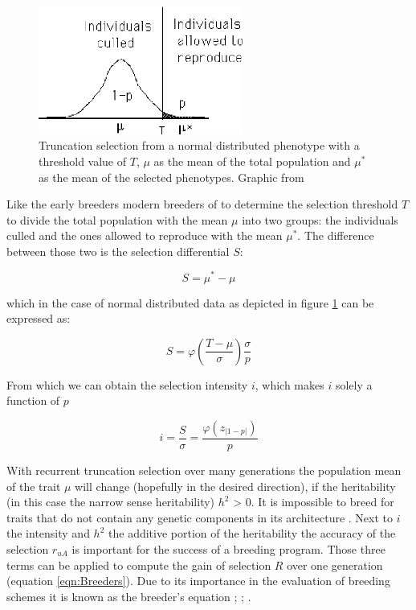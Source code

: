 \begin{figure}[H]
  \centering \includegraphics[height=.25\textheight, width=0.6\textwidth]{Figures/truncSel} \decoRule
  \caption[Truncation selection of a normal distributed phenotype]{Truncation selection from a normal distributed phenotype with a threshold value of $T$, $\mu$ as the mean of the total population and $\mu^{\ast}$ as the mean of the selected phenotypes. Graphic from \cite{walsh2018short}}
 \label{fig:trunSel}
\end{figure}


Like the early breeders modern breeders of to determine the selection threshold $T$ to divide the total population with the mean $\mu$ into two groups: the individuals culled and the ones allowed to reproduce with the mean $\mu^{\ast}$. The difference between those two is the selection differential $S$:

\begin{equation}
 S = \mu^{\ast} - \mu
\label{eqn:S}
\end{equation}

which in the case of normal distributed data as depicted in figure \ref{fig:trunSel} can be expressed as:

\begin{equation}
S = \varphi (\frac{T - \mu}{\sigma}) \frac{\sigma}{p}
\end{equation}

From which we can obtain the selection intensity $i$, which makes $i$ solely a function of $p$ 

\begin{equation}
i = \frac{S}{\sigma} = \frac{\varphi (z_{|1-p|})}{p}
\end{equation}


With recurrent truncation selection over many generations the population mean of the trait $\mu$ will change
(hopefully in the desired direction), if the heritability (in this case the narrow sense heritability) $h^2$ >
0. It is impossible to breed for traits that do not contain any genetic components in its architecture
\cite{walsh2018}. Next to $i$ the intensity and $h^2$ the additive portion of the heritability the accuracy
of the selection $r_{uA}$ is important for the success of a breeding program. Those three terms can be applied
to compute the gain of selection $R$ over one generation (equation \ref{eqn:Breeders}). Due to its importance
in the evaluation of breeding schemes it is known as the breeder's equation \cite{mousseau1987natural};
\cite{falconer1996}; \cite{kingsolver2001strength}.


